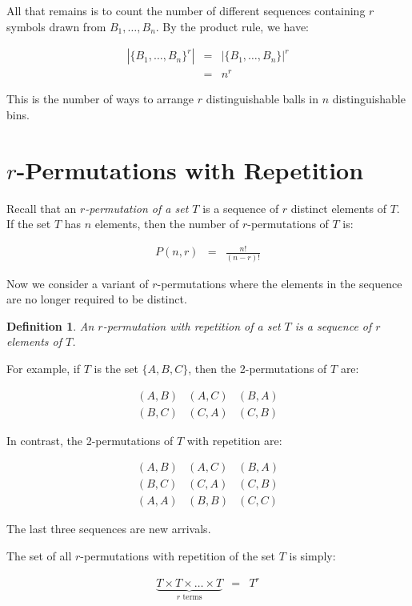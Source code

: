 \documentclass[twoside,12pt]{article}
\newtheorem{definition}{Definition}
\newcommand{\beqn}{\begin{eqnarray*}}
\newcommand{\eeqn}{\end{eqnarray*}}
\begin{document}
\noindent All that remains is to count the number of different
sequences containing $r$ symbols drawn from $B_1, \ldots, B_n$.  By
the product rule, we have:

\beqn
\left|\{B_1, \ldots, B_n\}^r\right|
	& = &	\left|\{B_1, \ldots, B_n\}\right|^r \\
	& = &	n^r
\eeqn

\noindent This is the number of ways to arrange $r$ distinguishable
balls in $n$ distinguishable bins.

\section{$r$-Permutations with Repetition}

Recall that an {\em $r$-permutation of a set $T$} is a sequence of $r$
distinct elements of $T$.  If the set $T$ has $n$ elements, then the
number of $r$-permutations of $T$ is:

\beqn
P(n, r) & = & \frac{n!}{(n-r)!}
\eeqn

\noindent Now we consider a variant of $r$-permutations where the
elements in the sequence are no longer required to be distinct.

\begin{definition}
An {\em $r$-permutation with repetition of a set $T$} is a sequence of
$r$ elements of $T$.
\end{definition}

For example, if $T$ is the set $\{ A, B, C \}$, then the
2-permutations of $T$ are:

\[
\begin{array}{ccc}
(A, B) & (A, C) & (B, A) \\
(B, C) & (C, A) & (C, B)
\end{array}
\]

\noindent In contrast, the 2-permutations of $T$ with repetition are:

\[
\begin{array}{cccl}
(A, B) & (A, C) & (B, A) \\
(B, C) & (C, A) & (C, B) \\
(A, A) & (B, B) & (C, C)
\end{array}
\]

\noindent The last three sequences are new arrivals.

The set of all $r$-permutations with repetition of the set $T$ is
simply:

\beqn
\underbrace{T \times T \times \ldots \times T}_{\text{$r$ terms}} & = & T^r
\eeqn
\end{document}
